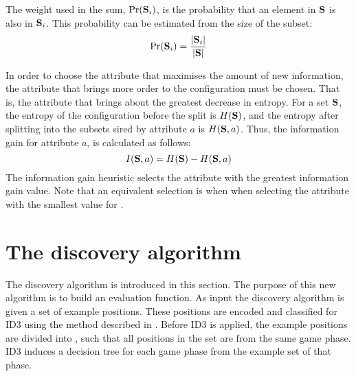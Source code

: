 The weight used in the sum, $\mbox{Pr}({\bf S}_i)$, is the probability that an element in ${\bf S}$ is also in ${\bf S}_i$.  This probability can be estimated from the size of the subset:
\begin{equation}
\mbox{Pr}({\bf S}_i) = \frac{|{\bf S}_i|}{|{\bf S}|}
\label{eq:subset_probability}
\end{equation}

In order to choose the attribute that maximises the amount of new information, the attribute that brings more order to the configuration must be chosen.  That is, the attribute that brings about the greatest decrease in entropy. For a set ${\bf S}$, the entropy of the configuration before the split is $H({\bf S})$, and the entropy after splitting into the subsets sired by attribute $a$ is $H({\bf S},a)$. Thus, the information gain for attribute $a$, is calculated as follows:
\begin{equation}
I({\bf S},a) = H({\bf S}) - H({\bf S},a)
\label{eq:gain}
\end{equation}
The information gain heuristic selects the attribute with the greatest information gain value. Note that an equivalent selection is when when selecting the attribute with the smallest value for . 


\section{The discovery algorithm}
\label{sec:discovery_algorithm}
The discovery algorithm is introduced in this section.  The purpose of this new algorithm is to build an evaluation function. As input the discovery algorithm is given a set of example positions. These positions are encoded and classified for ID3 using the method described in .
Before ID3 is applied, the example positions are divided into , such that all positions in the set are from the same game phase.  ID3 induces a decision tree for each game phase from the example set of that phase.   

